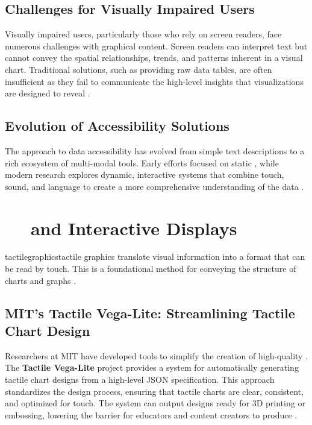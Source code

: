\subsection{Challenges for Visually Impaired Users}\label{ch13:ssec:challenges}
Visually impaired users, particularly those who rely on screen readers, face numerous challenges with graphical content. Screen readers can interpret text but cannot convey the spatial relationships, trends, and patterns inherent in a visual chart. Traditional solutions, such as providing raw data tables, are often insufficient as they fail to communicate the high-level insights that visualizations are designed to reveal \supercite{Lundgard2021, Zewe2021Making}.

\subsection{Evolution of Accessibility Solutions}\label{ch13:ssec:evolution}
The approach to data accessibility has evolved from simple text descriptions to a rich ecosystem of multi-modal tools. Early efforts focused on static , while modern research explores dynamic, interactive systems that combine touch, sound, and language to create a more comprehensive understanding of the data \supercite{Zewe2022Making, Lundgard2022Accessible}.

\section{~~ and Interactive Displays}\label{ch13:sec:tactile-graphics}
\gls{tactilegraphics}tactile graphics translate visual information into a format that can be read by touch. This is a foundational method for conveying the structure of charts and graphs \supercite{CreatingTactileGraphics}.

\subsection{MIT's Tactile Vega-Lite: Streamlining Tactile Chart Design}\label{ch13:ssec:tactile-vega-lite}
Researchers at MIT have developed tools to simplify the creation of high-quality . The \textbf{Tactile Vega-Lite} project provides a system for automatically generating tactile chart designs from a high-level JSON specification. This approach standardizes the design process, ensuring that tactile charts are clear, consistent, and optimized for touch. The system can output designs ready for 3D printing or embossing, lowering the barrier for educators and content creators to produce  \supercite{TactileVegaLite}.

